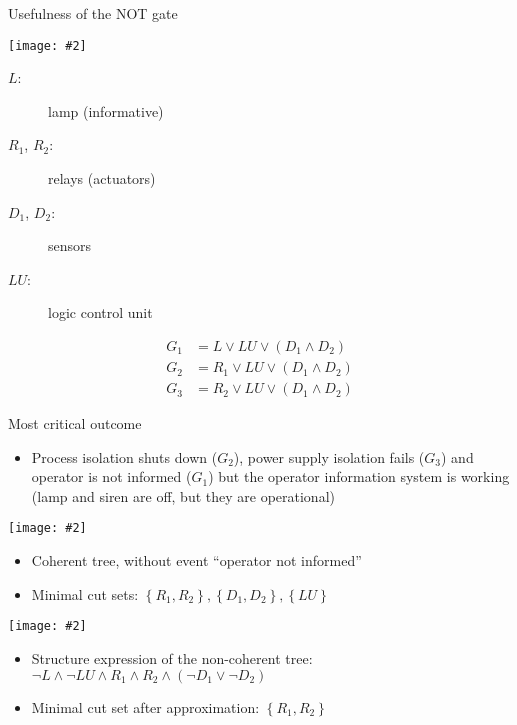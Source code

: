 \documentclass{beamer}
\newcommand{\includegraphicsaspectratio}[2][1]{%
  \texttt{[image: \#2]}%
}
\begin{document}
\begin{frame}{Usefulness of the NOT gate}
	\begin{center}
		\begin{minipage}{0.6\textwidth}
			\includegraphicsaspectratio[1]{ft-generic-failure-gas-detection-system}
		\end{minipage}
		\begin{minipage}{0.39\textwidth}
			\footnotesize
			\begin{description}
				\item[$L$:] lamp (informative)
				\item[$R_1$, $R_2$:] relays (actuators)
				\item[$D_1$, $D_2$:] sensors
				\item[$LU$:] logic control unit
			\end{description}
			\begin{align*}
				G_1 & = L \lor LU \lor \left(D_1 \land D_2\right)\\
				G_2 & = R_1 \lor LU \lor \left(D_1 \land D_2\right)\\
				G_3 & = R_2 \lor LU \lor \left(D_1 \land D_2\right)
			\end{align*}
		\end{minipage}
	\end{center}
\end{frame}

\begin{frame}{Most critical outcome}
	\footnotesize
	\begin{itemize}
		\item Process isolation shuts down ($G_2$), power supply isolation fails ($G_3$) and operator is not informed ($G_1$) but the operator information system is working (lamp and siren are off, but they are operational)
	\end{itemize}
	\begin{minipage}{0.38\textwidth}
		\footnotesize
		\includegraphicsaspectratio[0.95]{outcome-4-coherent-ft}
		\begin{itemize}
			\item Coherent tree, without event ``operator not informed''
			\item Minimal cut sets: $\left\{R_1, R_2\right\}, \left\{D_1, D_2\right\}, \left\{LU\right\} $
		\end{itemize}
	\end{minipage}
	\begin{minipage}{0.52\textwidth}
		\footnotesize
		\includegraphicsaspectratio[0.95]{outcome-4-non-coherent-ft}
		\begin{itemize}
			\item Structure expression of the non-coherent tree: $\lnot L \land \lnot LU \land R_1 \land R_2 \land \left(\lnot D_1 \lor \lnot D_2\right)$
			\item Minimal cut set after approximation: $\left\{R_1, R_2\right\} $
		\end{itemize}
	\end{minipage}
\end{frame}
\end{document}
